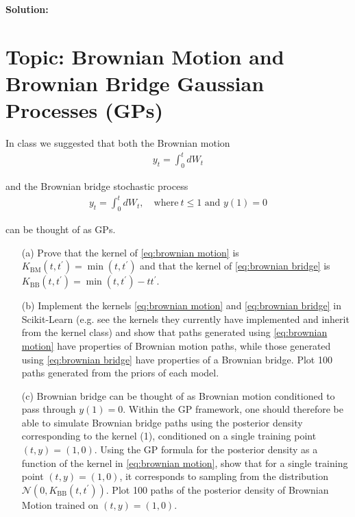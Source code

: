 \documentclass[11pt]{article}
\theoremstyle{plain} %
\newenvironment{solution}
{\color{C2}\normalfont\begin{framed}\begingroup\textbf{Solution:} }
  {\endgroup\end{framed}}
\theoremstyle{remark}
\begin{document}
\begin{solution}

\end{solution}


\section{Topic: Brownian Motion and Brownian Bridge Gaussian Processes (GPs)}

In class we suggested that both the Brownian motion
\begin{align}
  y_{t}=\int_{0}^{t} d W_{t} \label{eq:brownian motion}
\end{align}


and the Brownian bridge stochastic process
\begin{align}
y_{t}=\int_{0}^{t} d W_{t}, \quad \text{where} \ t \leq 1 \text{ and } y(1)=0
\label{eq:brownian bridge}
\end{align}

can be thought of as GPs.

\begin{enumerate}
    \item[(a)] Prove that the kernel of \cref{eq:brownian motion} is \( K_{\mathrm{BM}}\left(t,
    t^{\prime}\right)=\min \left(t, t^{\prime}\right) \) and that the kernel of
    \cref{eq:brownian bridge} is \( K_{\mathrm{BB}}\left(t, t^{\prime}\right)=\min \left(t,
    t^{\prime}\right)-t t^{\prime} \).
    
    \item[(b)] Implement the kernels \cref{eq:brownian motion} and \cref{eq:brownian bridge} in Scikit-Learn (e.g. see the
    kernels they currently have implemented and inherit from the kernel class)
    and show that paths generated using \cref{eq:brownian motion} have properties of Brownian motion
    paths, while those generated using \cref{eq:brownian bridge} have properties of a Brownian bridge.
    Plot 100 paths generated from the priors of each model.
    
    \item[(c)] Brownian bridge can be thought of as Brownian motion conditioned
    to pass through \( y(1)=0 \). Within the GP framework, one should therefore
    be able to simulate Brownian bridge paths using the posterior density
    corresponding to the kernel (1), conditioned on a single training point \(
    (t, y)=(1,0) \). Using the GP formula for the posterior density as a
    function of the kernel in \cref{eq:brownian motion}, show that for a single training point \( (t,
    y)=(1,0) \), it corresponds to sampling from the distribution \(
    \mathcal{N}\left(0, K_{\mathrm{BB}}\left(t, t^{\prime}\right)\right) \).
    Plot 100 paths of the posterior density of Brownian Motion trained on \( (t,
    y)=(1,0) \).
\end{enumerate}
\end{document}
